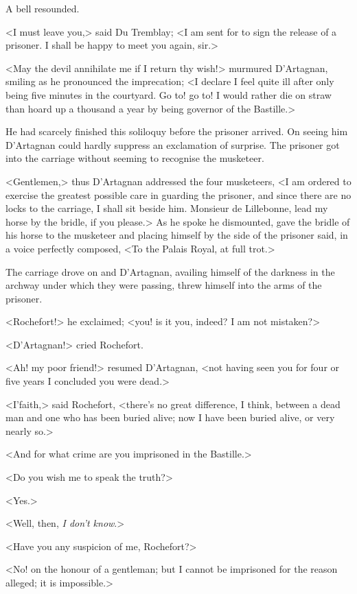 A bell resounded.

<I must leave you,> said Du Tremblay; <I am sent for to sign the release of a prisoner. I shall be happy to meet you again, sir.>

<May the devil annihilate me if I return thy wish!> murmured D'Artagnan, smiling as he pronounced the imprecation; <I declare I feel quite ill after only being five minutes in the courtyard. Go to! go to! I would rather die on straw than hoard up a thousand a year by being governor of the Bastille.>

He had scarcely finished this soliloquy before the prisoner arrived. On seeing him D'Artagnan could hardly suppress an exclamation of surprise. The prisoner got into the carriage without seeming to recognise the musketeer.

<Gentlemen,> thus D'Artagnan addressed the four musketeers, <I am ordered to exercise the greatest possible care in guarding the prisoner, and since there are no locks to the carriage, I shall sit beside him. Monsieur de Lillebonne, lead my horse by the bridle, if you please.> As he spoke he dismounted, gave the bridle of his horse to the musketeer and placing himself by the side of the prisoner said, in a voice perfectly composed, <To the Palais Royal, at full trot.>

The carriage drove on and D'Artagnan, availing himself of the darkness in the archway under which they were passing, threw himself into the arms of the prisoner.

<Rochefort!> he exclaimed; <you! is it you, indeed? I am not mistaken?>

<D'Artagnan!> cried Rochefort.

<Ah! my poor friend!> resumed D'Artagnan, <not having seen you for four or five years I concluded you were dead.>

<I'faith,> said Rochefort, <there's no great difference, I think, between a dead man and one who has been buried alive; now I have been buried alive, or very nearly so.>

<And for what crime are you imprisoned in the Bastille.>

<Do you wish me to speak the truth?>

<Yes.>

<Well, then, \emph{I don't know}.>

<Have you any suspicion of me, Rochefort?>

<No! on the honour of a gentleman; but I cannot be imprisoned for the reason alleged; it is impossible.>

